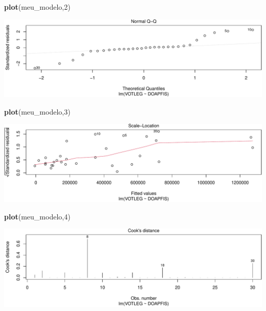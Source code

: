 \documentclass[
  9pt,
  ignorenonframetext,
  aspectratio=169]{beamer}
\newenvironment{Shaded}{\begin{snugshade}}{\end{snugshade}}
\newcommand{\DecValTok}[1]{\textcolor[rgb]{0.00,0.00,0.81}{#1}}
\newcommand{\KeywordTok}[1]{\textcolor[rgb]{0.13,0.29,0.53}{\textbf{#1}}}
\newcommand{\NormalTok}[1]{#1}
\begin{document}
\begin{frame}[fragile]{}
\protect\hypertarget{section-7}{}
\begin{Shaded}
\begin{Highlighting}[]
\KeywordTok{plot}\NormalTok{(meu\_modelo,}\DecValTok{2}\NormalTok{)}
\end{Highlighting}
\end{Shaded}

\includegraphics{aula_12_files/figure-beamer/unnamed-chunk-21-1.pdf}
\end{frame}

\begin{frame}[fragile]{}
\protect\hypertarget{section-8}{}
\begin{Shaded}
\begin{Highlighting}[]
\KeywordTok{plot}\NormalTok{(meu\_modelo,}\DecValTok{3}\NormalTok{)}
\end{Highlighting}
\end{Shaded}

\includegraphics{aula_12_files/figure-beamer/unnamed-chunk-22-1.pdf}
\end{frame}

\begin{frame}[fragile]{}
\protect\hypertarget{section-9}{}
\begin{Shaded}
\begin{Highlighting}[]
\KeywordTok{plot}\NormalTok{(meu\_modelo,}\DecValTok{4}\NormalTok{)}
\end{Highlighting}
\end{Shaded}

\includegraphics{aula_12_files/figure-beamer/unnamed-chunk-23-1.pdf}
\end{frame}
\end{document}

